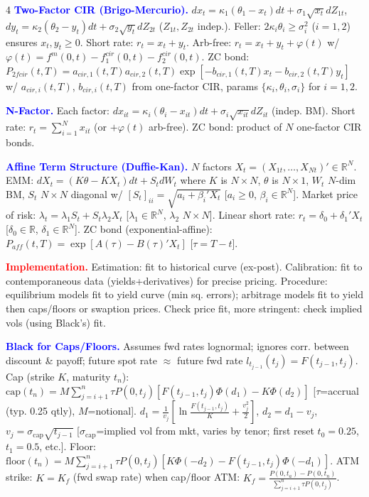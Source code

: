 \documentclass[landscape]{article}
\begin{document}
\begin{multicols}{4}
\textcolor{blue}{\textbf{Two-Factor CIR (Brigo-Mercurio).}} $dx_t=\kappa_1(\theta_1-x_t)dt+\sigma_1\sqrt{x_t}dZ_{1t}$, $dy_t=\kappa_2(\theta_2-y_t)dt+\sigma_2\sqrt{y_t}dZ_{2t}$ ($Z_{1t},Z_{2t}$ indep.). Feller: $2\kappa_i\theta_i\geq\sigma_i^2$ ($i=1,2$) ensures $x_t,y_t\geq 0$. Short rate: $r_t=x_t+y_t$. Arb-free: $r_t=x_t+y_t+\varphi(t)$ w/ $\varphi(t)=f^m(0,t)-f^{cir}_1(0,t)-f^{cir}_2(0,t)$. ZC bond: $P_{2fcir}(t,T)=a_{cir,1}(t,T)a_{cir,2}(t,T)\exp[-b_{cir,1}(t,T)x_t-b_{cir,2}(t,T)y_t]$ w/ $a_{cir,i}(t,T)$, $b_{cir,i}(t,T)$ from one-factor CIR, params $\{\kappa_i,\theta_i,\sigma_i\}$ for $i=1,2$.

\textcolor{blue}{\textbf{N-Factor.}} Each factor: $dx_{it}=\kappa_i(\theta_i-x_{it})dt+\sigma_i\sqrt{x_{it}}dZ_{it}$ (indep. BM). Short rate: $r_t=\sum_{i=1}^N x_{it}$ (or $+\varphi(t)$ arb-free). ZC bond: product of $N$ one-factor CIR bonds.

\textcolor{blue}{\textbf{Affine Term Structure (Duffie-Kan).}} $N$ factors $X_t=(X_{1t},\ldots,X_{Nt})'\in\mathbb{R}^N$. EMM: $dX_t=(K\theta-KX_t)dt+S_t dW_t$ where $K$ is $N\times N$, $\theta$ is $N\times 1$, $W_t$ $N$-dim BM, $S_t$ $N\times N$ diagonal w/ $[S_t]_{ii}=\sqrt{a_i+\beta_i'X_t}$ [$a_i\geq 0$, $\beta_i\in\mathbb{R}^N$]. Market price of risk: $\lambda_t=\lambda_1 S_t+S_t\lambda_2 X_t$ [$\lambda_1\in\mathbb{R}^N$, $\lambda_2$ $N\times N$]. Linear short rate: $r_t=\delta_0+\delta_1'X_t$ [$\delta_0\in\mathbb{R}$, $\delta_1\in\mathbb{R}^N$]. ZC bond (exponential-affine): $P_{aff}(t,T)=\exp[A(\tau)-B(\tau)'X_t]$ [$\tau=T-t$].

\textcolor{red}{\textbf{Implementation.}}
Estimation: fit to historical curve (ex-post). Calibration: fit to contemporaneous data (yields+derivatives) for precise pricing. Procedure: equilibrium models fit to yield curve (min sq. errors); arbitrage models fit to yield then caps/floors or swaption prices. Check price fit, more stringent: check implied vols (using Black's) fit.

\textcolor{blue}{\textbf{Black for Caps/Floors.}} Assumes fwd rates lognormal; ignores corr. between discount \& payoff; future spot rate $\approx$ future fwd rate $l_{t_{j-1}}(t_j)=F(t_{j-1},t_j)$. Cap (strike $K$, maturity $t_n$): $\text{cap}(t_n)=M\sum_{j=i+1}^n\tau P(0,t_j)[F(t_{j-1},t_j)\Phi(d_1)-K\Phi(d_2)]$ [$\tau$=accrual (typ. 0.25 qtly), $M$=notional]. $d_1=\frac{1}{v_j}[\ln\frac{F(t_{j-1},t_j)}{K}+\frac{v_j^2}{2}]$, $d_2=d_1-v_j$, $v_j=\sigma_{\text{cap}}\sqrt{t_{j-1}}$ [$\sigma_{\text{cap}}$=implied vol from mkt, varies by tenor; first reset $t_0=0.25$, $t_1=0.5$, etc.]. Floor: $\text{floor}(t_n)=M\sum_{j=i+1}^n\tau P(0,t_j)[K\Phi(-d_2)-F(t_{j-1},t_j)\Phi(-d_1)]$. ATM strike: $K=K_f$ (fwd swap rate) when cap/floor ATM: $K_f=\frac{P(0,t_a)-P(0,t_n)}{\sum_{j=i+1}^n\tau P(0,t_j)}$.


\end{multicols}
\end{document}
